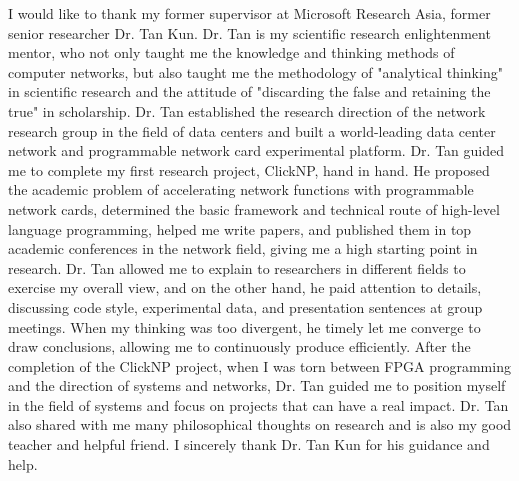 \begin{acknowledgements}
I would like to thank my former supervisor at Microsoft Research Asia, former senior researcher Dr. Tan Kun. Dr. Tan is my scientific research enlightenment mentor, who not only taught me the knowledge and thinking methods of computer networks, but also taught me the methodology of "analytical thinking" in scientific research and the attitude of "discarding the false and retaining the true" in scholarship. Dr. Tan established the research direction of the network research group in the field of data centers and built a world-leading data center network and programmable network card experimental platform. Dr. Tan guided me to complete my first research project, ClickNP, hand in hand. He proposed the academic problem of accelerating network functions with programmable network cards, determined the basic framework and technical route of high-level language programming, helped me write papers, and published them in top academic conferences in the network field, giving me a high starting point in research. Dr. Tan allowed me to explain to researchers in different fields to exercise my overall view, and on the other hand, he paid attention to details, discussing code style, experimental data, and presentation sentences at group meetings. When my thinking was too divergent, he timely let me converge to draw conclusions, allowing me to continuously produce efficiently. After the completion of the ClickNP project, when I was torn between FPGA programming and the direction of systems and networks, Dr. Tan guided me to position myself in the field of systems and focus on projects that can have a real impact. Dr. Tan also shared with me many philosophical thoughts on research and is also my good teacher and helpful friend. I sincerely thank Dr. Tan Kun for his guidance and help.


\end{acknowledgements}
